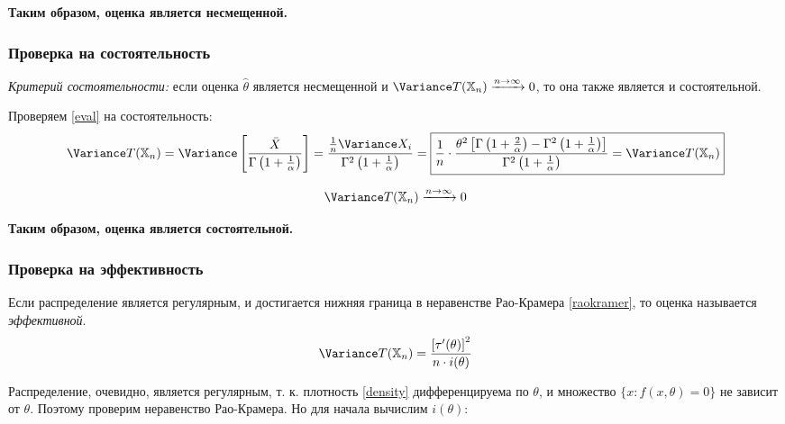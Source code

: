 \documentclass[12pt]{article}
\begin{document}
\begin{center}
\textbf{Таким образом, оценка является несмещенной.}
\end{center}

\subsubsection{Проверка на состоятельность}

\textsl{Критерий состоятельности:} если оценка $\hat{\theta}$ является несмещенной и $\Variance T(\mathbb{X}_n) \xrightarrow{n\to \infty} 0 $, то она также является и состоятельной.

\noindent Проверяем \eqref{eval} на состоятельность:
\begin{equation}\label{dtx}
\Variance T(\mathbb{X}_n) = \Variance \left[\frac{\bar{X}}{\Gamma \left(1+\frac{1}{\alpha} \right)}\right] = \frac{\frac{1}{n} \Variance X_i}{\Gamma^2 \left(1+\frac{1}{\alpha} \right)} = \boxed{\frac{1}{n}\cdot \frac{\theta^2\left[\Gamma \left(1+\frac{2}{\alpha} \right) - \Gamma^2 \left(1+\frac{1}{\alpha} \right)\right]}{\Gamma^2 \left(1+\frac{1}{\alpha} \right)} = \Variance T(\mathbb{X}_n)}
\end{equation}

$$
\Variance T(\mathbb{X}_n) \xrightarrow{n\to \infty} 0
$$

\begin{center}
\textbf{Таким образом, оценка является состоятельной.}
\end{center}

\subsubsection{Проверка на эффективность}
Если распределение является регулярным, и достигается нижняя граница в неравенстве Рао-Крамера \eqref{raokramer}, то оценка называется \textsl{эффективной}.
\begin{equation}\label{raokramer}
\Variance T(\mathbb{X}_n) = \frac{\left[\tau'(\theta)\right]^2}{n\cdot i(\theta)}
\end{equation}

Распределение, очевидно, является регулярным, т. к. плотность \eqref{density} дифференцируема по $\theta$, и множество $\{x : f(x, \theta)=0\}$ не зависит от $\theta$. Поэтому проверим неравенство Рао-Крамера. Но для начала вычислим $i(\theta)$:
\end{document}
